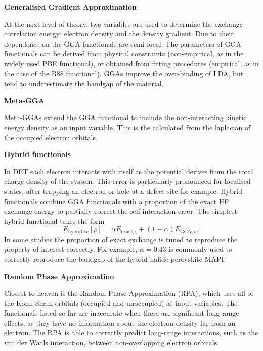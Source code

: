 \textbf{Generalised Gradient Approximation}

At the next level of theory, two variables are used to determine the exchange-correlation energy: electron density and the density gradient. Due to their dependence on the GGA functionals are semi-local. The parameters of GGA functionals can be derived from physical constraints (non-empirical, as in the widely used PBE functional), or obtained from fitting procedures (empirical, as in the case of the B88 functional). GGAs improve the over-binding of LDA, but tend to underestimate the bandgap of the material.


\textbf{Meta-GGA} 

Meta-GGAs extend the GGA functional to include the non-interacting kinetic energy density as an input variable. This is the calculated from the laplacian of the occupied electron orbitals.


\textbf{Hybrid functionals} 

In DFT each electron interacts with itself as the potential derives from the total charge density of the system. This error is particularly pronounced for localised states, after trapping an electron or hole at a defect site for example. Hybrid functionals combine GGA functionals with a proportion of the exact HF exchange energy to partially correct the self-interaction error. The simplest hybrid functional takes the form
\begin{equation}
E_{\textrm{hybrid,xc}}\left[\rho\right] = \alpha E_{\textrm{exact,x}} + \left(1-\alpha\right)E_{\textrm{GGA,xc}}.
\end{equation}
In some studies the proportion of exact exchange is tuned to reproduce the property of interest correctly. For example, $\alpha=0.43$ is commonly used to correctly reproduce the bandgap of the hybrid halide perovskite MAPI. %

 
\textbf{Random Phase Approximation} 

Closest to heaven is the Random Phase Approximation (RPA), which uses all of the Kohn-Sham orbitals (occupied and unoccupied) as input variables. The functionals listed so far are inaccurate when there are significant long range effects, as they have no information about the electron density far from an electron. The RPA is able to correctly predict long-range interactions, such as the van der Waals interaction, between non-overlapping electron orbitals.

